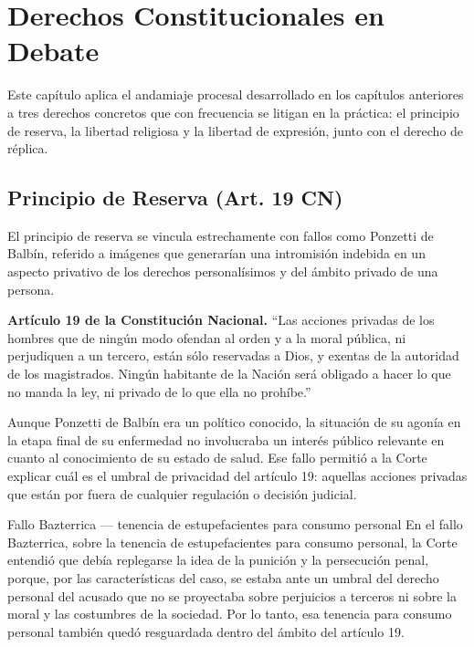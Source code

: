 \documentclass[12pt,oneside]{book}
\begin{document}
\chapter{Derechos Constitucionales en Debate}

Este capítulo aplica el andamiaje procesal desarrollado en los capítulos anteriores a tres derechos concretos que con frecuencia se litigan en la práctica: el principio de reserva, la libertad religiosa y la libertad de expresión, junto con el derecho de réplica.

\section{Principio de Reserva (Art. 19 CN)}

El principio de reserva se vincula estrechamente con fallos como Ponzetti de Balbín, referido a imágenes que generarían una intromisión indebida en un aspecto privativo de los derechos personalísimos y del ámbito privado de una persona.

\begin{important}
\textbf{Artículo 19 de la Constitución Nacional.} ``Las acciones privadas de los hombres que de ningún modo ofendan al orden y a la moral pública, ni perjudiquen a un tercero, están sólo reservadas a Dios, y exentas de la autoridad de los magistrados. Ningún habitante de la Nación será obligado a hacer lo que no manda la ley, ni privado de lo que ella no prohíbe.''
\end{important}

Aunque Ponzetti de Balbín era un político conocido, la situación de su agonía en la etapa final de su enfermedad no involucraba un interés público relevante en cuanto al conocimiento de su estado de salud. Ese fallo permitió a la Corte explicar cuál es el umbral de privacidad del artículo 19: aquellas acciones privadas que están por fuera de cualquier regulación o decisión judicial.

\begin{example}{Fallo Bazterrica --- tenencia de estupefacientes para consumo personal}
En el fallo Bazterrica, sobre la tenencia de estupefacientes para consumo personal, la Corte entendió que debía replegarse la idea de la punición y la persecución penal, porque, por las características del caso, se estaba ante un umbral del derecho personal del acusado que no se proyectaba sobre perjuicios a terceros ni sobre la moral y las costumbres de la sociedad. Por lo tanto, esa tenencia para consumo personal también quedó resguardada dentro del ámbito del artículo 19.
\end{example}
\end{document}
